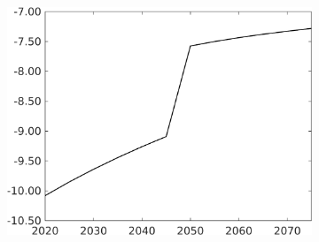 \begin{figure}[h!!]
\begin{subfigure}[]{0.4\textwidth}
 	\includegraphics[width=1\textwidth]{../../codding_model/own_basedOnFried/optimalPol_010922_revision/figures/all_13Sept22/CompTaufPER_bytaul_Reg5_Tauf_spillover0_nsk0_xgr0_knspil0_sep0_LFlimit1_emsbase0_countec0_GovRev0_etaa0.79_lgd0.png} \end{subfigure}		
	\vspace{2mm}
	

\end{figure}
